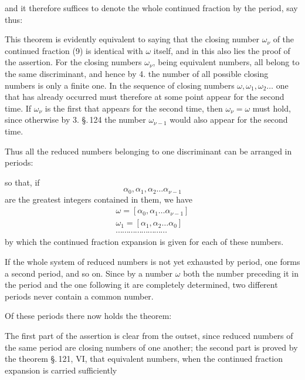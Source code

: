 
and it therefore suffices to denote the whole continued fraction by the period, say thus:


This theorem is evidently equivalent to saying that the closing number $\omega_\nu$ of the continued fraction (9) is identical with $\omega$ itself, and in this also lies the proof of the assertion. For the closing numbers $\omega_\nu$, being equivalent numbers, all belong to the same discriminant, and hence by 4. the number of all possible closing numbers is only a finite one. In the sequence of closing numbers $\omega, \omega_1, \omega_2 \ldots$ one that has already occurred must therefore at some point appear for the second time. If $\omega_\nu$ is the first that appears for the second time, then $\omega_\nu = \omega$ must hold, since otherwise by 3. \S.\,124 the number $\omega_{\nu-1}$ would also appear for the second time.

Thus all the reduced numbers belonging to one discriminant can be arranged in periods:


so that, if
\[
\alpha_0, \alpha_1, \alpha_2 \ldots \alpha_{\nu-1}
\]
are the greatest integers contained in them, we have
\[
\begin{array}{l}
\omega = [\alpha_0, \alpha_1 \ldots \alpha_{\nu-1}]\\
\omega_1 = [\alpha_1, \alpha_2 \ldots \alpha_0]\\
\cdots\cdots\cdots\cdots\cdots\cdots\cdots\cdots
\end{array}
\]
by which the continued fraction expansion is given for each of these numbers.

If the whole system of reduced numbers is not yet exhausted by  period, one forms a second period, and so on. Since by a number $\omega$ both the number preceding it in the period and the one following it are completely determined, two different periods never contain a common number.

Of these periods there now holds the theorem:


The first part of the assertion is clear from the outset, since reduced numbers of the same period are closing numbers of one another; the second part is proved by the theorem \S.\,121, VI, that equivalent numbers, when the continued fraction expansion is carried sufficiently
